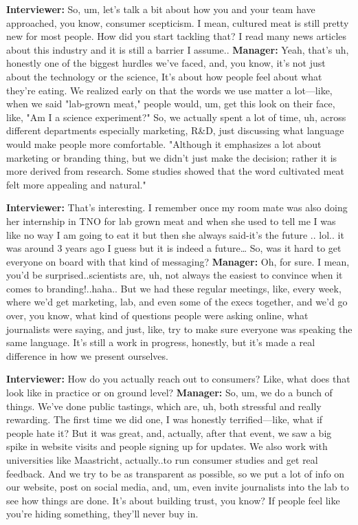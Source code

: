 \textbf{Interviewer:} So, um, let's talk a bit about how you and your team have approached, you know, consumer scepticism. I mean, cultured meat is still pretty new for most people. How did you start tackling that? I read many news articles about this industry and it is still a barrier I assume.. \newline
\textbf{Manager:} Yeah, that's uh, honestly one of the biggest hurdles we've faced, and, you know, it's not just about the technology or the science,  It's about how people feel about what they're eating. We realized early on that the words we use matter a lot—like, when we said "lab-grown meat," people would, um, get this look on their face, like, "Am I a science experiment?" So, we actually spent a lot of time, uh, across different departments especially marketing, R\&D, just discussing what language would make people more comfortable. "Although it emphasizes a lot about marketing or branding thing, but we didn't just make the decision; rather it is more derived from research. Some studies showed that the word cultivated meat felt more appealing and natural." \newline

\textbf{Interviewer:} That's interesting. I remember once my room mate was also doing her internship in TNO for lab grown meat and when she used to tell me I was like no way I am going to eat it but then she always said-it's the future .. lol.. it was around 3 years ago I guess but it is indeed a future… So, was it hard to get everyone on board with that kind of messaging? \newline
\textbf{Manager:} Oh, for sure. I mean, you'd be surprised..scientists are, uh, not always the easiest to convince when it comes to branding!..haha.. But we had these regular meetings, like, every week, where we'd get marketing, lab, and even some of the execs together, and we'd go over, you know, what kind of questions people were asking online, what journalists were saying, and just, like, try to make sure everyone was speaking the same language. It's still a work in progress, honestly, but it's made a real difference in how we present ourselves. \newline

\textbf{Interviewer:} How do you actually reach out to consumers? Like, what does that look like in practice or on ground level? \newline
\textbf{Manager:} So, um, we do a bunch of things. We've done public tastings, which are, uh, both stressful and really rewarding. The first time we did one, I was honestly terrified—like, what if people hate it? But it was great, and, actually, after that event, we saw a big spike in website visits and people signing up for updates. We also work with universities like Maastricht, actually..to run consumer studies and get real feedback. And we try to be as transparent as possible, so we put a lot of info on our website, post on social media, and, um, even invite journalists into the lab to see how things are done. It's about building trust, you know? If people feel like you're hiding something, they'll never buy in. \newline

